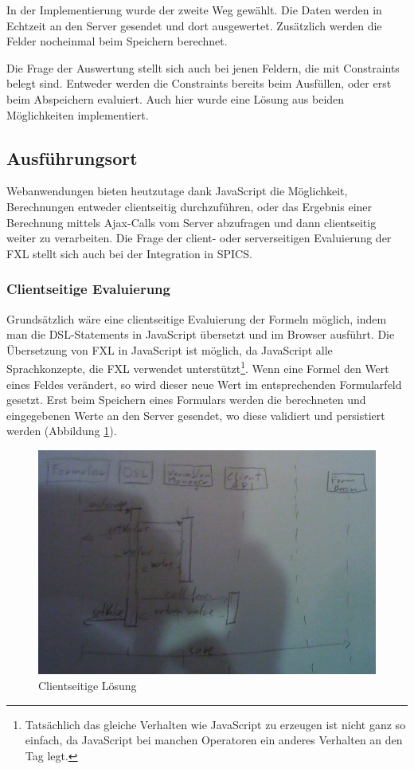 In der Implementierung wurde der zweite Weg gewählt. Die Daten werden in Echtzeit an den Server gesendet und dort ausgewertet. Zu\-sätz\-lich werden die Felder nocheinmal beim Speichern berechnet.

Die Frage der Auswertung stellt sich auch bei jenen Feldern, die mit Constraints belegt sind. Entweder werden die Constraints bereits beim Ausfüllen, oder erst beim Abspeichern evaluiert. Auch hier wurde eine Lösung aus beiden Möglichkeiten implementiert. 


\subsection{Ausführungsort}
\label{integration_ausfuehrungsort}

Webanwendungen bieten heutzutage dank Java\-Script die Möglichkeit, Berechnungen entweder clientseitig durchzuführen, oder das Ergebnis einer Berechnung mittels Ajax-Calls vom Server abzufragen und dann clientseitig weiter zu verarbeiten. Die Frage der client- oder serverseitigen Evaluierung der FXL stellt sich auch bei der Integration in SPICS.

\subsubsection{Clientseitige Evaluierung}

Grundsätzlich wäre eine clientseitige Evaluierung der Formeln möglich, indem man die DSL-Statements in Java\-Script übersetzt und im Browser ausführt. Die Übersetzung von FXL in Java\-Script ist möglich, da Java\-Script alle Sprachkonzepte, die FXL verwendet unterstützt\footnote{Tatsächlich das gleiche Verhalten wie Java\-Script zu erzeugen ist nicht ganz so einfach, da Java\-Script bei manchen Operatoren ein anderes Verhalten an den Tag legt.}. Wenn eine Formel den Wert eines Feldes verändert, so wird dieser neue Wert im entsprechenden Formularfeld gesetzt. Erst beim Speichern eines Formulars werden die berechneten und eingegebenen Werte an den Server gesendet, wo diese validiert und persistiert werden (Abbildung \ref{abb_uml_seq_client}).

\begin{figure}[th]
\includegraphics[scale=0.3]{figures/uml_seq_client}
\caption{Clientseitige Lösung}
\label{abb_uml_seq_client}
\end{figure}


